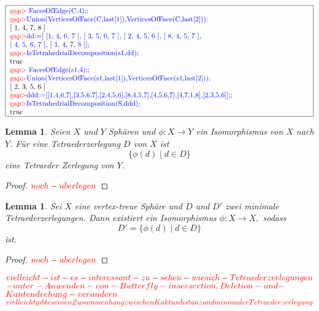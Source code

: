 \documentclass[12pt,titlepage,twoside,cleardoublepage]{article}
\theoremstyle{nummermitklammern}
\newtheorem{lemma}[temp]{Lemma}
\newtheorem{lemma}[zahl]{Lemma}
\numberwithin{equation}{section}
\begin{document}
 \begin{center}
 $\fbox{
\parbox{15cm}{
\textcolor{red}{gap$>$} \textcolor{blue}{FacesOfEdge(C,4);;}\newline 
\textcolor{red}{gap$>$}\textcolor{blue}{Union(VerticesOfFace(C,last[1]),VerticesOfFace(C,last[2]));}
\newline
 [ 1, 4, 7, 8 ]\newline 
\textcolor{red}{gap$>$}\textcolor{blue}{dd:=[ [1, 4, 6, 7 ], [ 3, 5, 6, 7 ], [ 2, 4, 5, 6 ], [ 8, 4, 5, 7 ],$ \newline $ [ 4, 5, 6, 7 ], [ 1,
4, 7, 8 ]];}\newline 
\textcolor{red}{gap$>$}\textcolor{blue}{ IsTetrahedrialDecomposition(s1,dd);}\newline 
true\newline 
\textcolor{red}{gap$>$} \textcolor{blue}{FacesOfEdge(s1,4);;}\newline 
\textcolor{red}{gap$>$}\textcolor{blue}{Union(VerticesOfFace(s1,last[1]),VerticesOfFace(s1,last[2]));}
\newline [ 2, 3, 5, 6 ]\newline 
\textcolor{red}{gap$>$}\textcolor{blue}{ddd:=[[1,4,6,7],[3,5,6,7],[2,4,5,6],[8,4,5,7],[4,5,6,7],[4,7,1,8],[2,3,5,6]];;}\newline 
\textcolor{red}{gap$>$}\textcolor{blue}{IsTetrahedrialDecomposition(S,ddd);}\newline 
true
 }}$
 \end{center}
\begin{lemma}
Seien $X$ und $Y$ Sphären und $\phi:X\to Y$ ein Isomorphismus von $X$ nach $Y$. Für eine Tetraederzerlegung $D$ von $X$ ist \[
\{\phi(d)\mid d\in D\}
\] eine Tetraeder Zerlegung von $Y$.
\end{lemma}
\begin{proof}
$\textcolor{red}{noch-uberlegen}$
\end{proof}
\begin{lemma}
Sei $X$ eine vertex-treue Sphäre und $D$ und $D'$ zwei minimale Tetraederzerlegungen. Dann existiert ein Isomorphismus $\phi:X\to X,$ sodass
\[
D'=\{\phi(d)\mid d\in D\}
\]
ist.
\end{lemma}
\begin{proof}
$\textcolor{red}{noch-uberlegen}$
\end{proof}
$
\textcolor{red}{vielleicht-ist-es-interessant-zu-sehen-wie sich-Tetraederzerlegungen}$
$\textcolor{red}{-unter-Anwenden-von-Butterfly-insersertion,Deletion-und-}$ 
$\textcolor{red}{Kantendrehung-verandern}
$
$\textcolor{red}{vielleicht gibt es einen Zusammenhang zwischen Kaktusdistanz und minimaler Tetraederzerlegung}$
\end{document}
